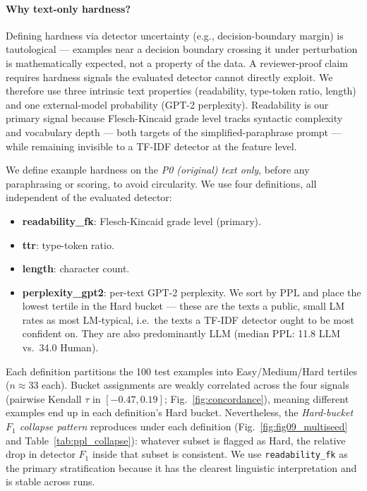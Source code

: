 \documentclass[11pt,a4paper]{article}
\begin{document}
\paragraph{Why text-only hardness?}
Defining hardness via detector uncertainty (e.g., decision-boundary margin)
is tautological — examples near a decision boundary crossing it under
perturbation is mathematically expected, not a property of the data. A
reviewer-proof claim requires hardness signals the evaluated detector
cannot directly exploit. We therefore use three intrinsic text properties
(readability, type-token ratio, length) and one external-model probability
(GPT-2 perplexity). Readability is our primary signal because Flesch-Kincaid
grade level tracks syntactic complexity and vocabulary depth — both targets
of the simplified-paraphrase prompt — while remaining invisible to a TF-IDF
detector at the feature level.

We define example hardness on the \emph{P0 (original) text only}, before any
paraphrasing or scoring, to avoid circularity. We use four definitions, all
independent of the evaluated detector:

\begin{itemize}
\item \textbf{readability\_fk}: Flesch-Kincaid grade level (primary).
\item \textbf{ttr}: type-token ratio.
\item \textbf{length}: character count.
\item \textbf{perplexity\_gpt2}: per-text GPT-2 perplexity. We sort by
$\mathrm{PPL}$ and place the lowest tertile in the Hard bucket — these are
the texts a public, small LM rates as most LM-typical, i.e.\ the texts a
TF-IDF detector ought to be most confident on. They are also predominantly
LLM (median PPL: 11.8 LLM vs.\ 34.0 Human).
\end{itemize}

Each definition partitions the 100 test examples into Easy/Medium/Hard
tertiles ($n \approx 33$ each). Bucket assignments are weakly correlated
across the four signals (pairwise Kendall $\tau$ in $[-0.47, 0.19]$;
Fig.~\ref{fig:concordance}), meaning different examples end up in each
definition's Hard bucket. Nevertheless, the \emph{Hard-bucket $F_1$ collapse
pattern} reproduces under each definition (Fig.~\ref{fig:fig09_multiseed}
and Table~\ref{tab:ppl_collapse}): whatever subset is flagged as Hard, the
relative drop in detector $F_1$ inside that subset is consistent.
We use \texttt{readability\_fk} as the primary stratification because it
has the clearest linguistic interpretation and is stable across runs.
\end{document}
